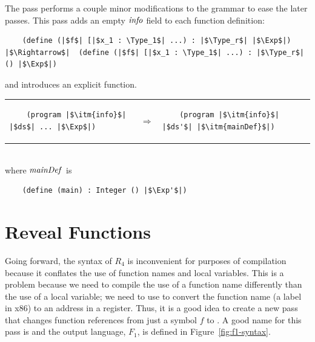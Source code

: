 \documentclass[11pt]{book}
\begin{document}
The  pass performs a couple minor modifications to the
grammar to ease the later passes. This pass adds an empty $\mathit{info}$
field to each function definition:
\begin{lstlisting}
    (define (|$f$| [|$x_1 : \Type_1$| ...) : |$\Type_r$| |$\Exp$|)
|$\Rightarrow$|  (define (|$f$| [|$x_1 : \Type_1$| ...) : |$\Type_r$| () |$\Exp$|)
\end{lstlisting}
and introduces an explicit  function.\\
\begin{tabular}{lll}
\begin{minipage}{0.45\textwidth}
\begin{lstlisting}
    (program |$\itm{info}$| |$ds$| ... |$\Exp$|)
\end{lstlisting}
\end{minipage}
&
$\Rightarrow$
&
\begin{minipage}{0.45\textwidth}
\begin{lstlisting}
    (program |$\itm{info}$| |$ds'$| |$\itm{mainDef}$|)
\end{lstlisting}
\end{minipage}
\end{tabular}  \\
where $\mathit{mainDef}$ is
\begin{lstlisting}
    (define (main) : Integer () |$\Exp'$|)
\end{lstlisting}


\section{Reveal Functions}
\label{sec:reveal-functions-r4}

Going forward, the syntax of $R_4$ is inconvenient for purposes of
compilation because it conflates the use of function names and local
variables. This is a problem because we need to compile the use of a
function name differently than the use of a local variable; we need to
use  to convert the function name (a label in x86) to an
address in a register.  Thus, it is a good idea to create a new pass
that changes function references from just a symbol $f$ to
. A good name for this pass is
 and the output language, $F_1$, is defined in
Figure~\ref{fig:f1-syntax}.
\end{document}
